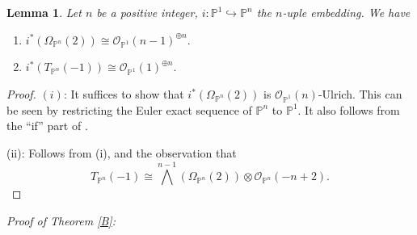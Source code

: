 \documentclass[11pt,letterpaper]{amsart}
\newtheorem{lemma}{Lemma}[section]
\begin{document}
\begin{lemma}\label{Tomega}
Let $n$ be a positive integer, $i:\mathbb P^1\hookrightarrow \mathbb P^n$
the $n$-uple embedding. We have
\begin{enumerate}
\item[(i)] $i^*\!\left(\Omega_{\mathbb P^n}(2)\right)
\cong
\mathcal O_{\mathbb P^1}(n-1)^{\oplus n}.$

\item[(ii)] $i^*\!\left(T_{\mathbb P^n}(-1)\right)
\cong
\mathcal O_{\mathbb P^1}(1)^{\oplus n}.$
\end{enumerate}
\end{lemma}

\begin{proof}
$(i)$: It suffices to show that $
i^*\!\left(\Omega_{\mathbb P^n}(2)\right)$
is $\mathcal{O}_{\mathbb{P}^1}(n)$-Ulrich. This can be seen by restricting the Euler exact sequence of
$\mathbb P^n$ to $\mathbb P^1$. It also follows from the ``if'' part of
\cite[Theorem 1.2(ii)]{lopez2026ulrichness}.

(ii): Follows from (i), and the observation that
\[
T_{\mathbb P^n}(-1)
\cong
\bigwedge^{n-1}\!\left(\Omega_{\mathbb P^n}(2)\right)
\otimes
\mathcal O_{\mathbb P^n}(-n+2).
\]
\end{proof}
\textit{Proof of Theorem \ref{B}:}
\end{document}
